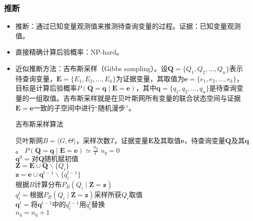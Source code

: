 \documentclass{ctexart}
\begin{document}
					\subsubsection{推断}
						\begin{itemize}
							\item 推断：通过已知变量观测值来推测待查询变量的过程。证据：已知变量观测值。
							\item 直接精确计算后验概率：NP-hard。
							\item 近似推断方法：吉布斯采样（Gibbs sampling）。设$\bm{Q}=\{Q_1,Q_2,\dots,Q_n\}$表示待查询变量，$\bm{E}=\{E_1,E_2,\dots,E_k\}$为证据变量，其取值为$\bm{e}=\{e_1,e_2,\dots,e_k\}$，目标是计算后验概率$P(\bm{Q}=\bm{q}\mid\bm{E}=\bm{e})$，其中$\bm{q}=\{q_1,q_2,\dots,q_n\}$是待查询变量的一组取值。吉布斯采样就是在贝叶斯网所有变量的联合状态空间与证据$\bm{E}=\bm{e}$一致的子空间中进行``随机漫步''。\begin{algorithm}
								\caption{吉布斯采样算法}
								\begin{algorithmic}[1]
									\REQUIRE 贝叶斯网$B=\langle G,\Theta\rangle$，采样次数$T$，证据变量$\bm{E}$及其取值$\bm{e}$，待查询变量$\bm{Q}$及其$\bm{q}$。
									\ENSURE $P(\bm{Q}=\bm{q}\mid\bm{E}=\bm{e})\simeq\frac{n_q}{T}$
									\STATE $n_q=0$ \\
									\STATE $\bm{q}^0=\textrm{对}\bm{Q}\textrm{随机赋初值}$ \\
											\STATE $\bm{Z}=\bm{E}\cup\bm{Q}\backslash\{Q_i\}$\\
											\STATE $\bm{z}=\bm{e}\cup\bm{q}^{t-1}\backslash\{q_i^{t-1}\}$\\
											\STATE 根据$B$计算分布$P_B(Q_i\mid\bm{Z}=\bm{z})$\\
											\STATE $q_i^t=\textrm{根据}P_B(Q_i\mid\bm{Z}=\bm{z})\textrm{采样所获}Q_i\textrm{取值}$\\
											\STATE $\bm{q}^t=\textrm{将}\bm{q}^{t-1}\textrm{中的}q_i^{t-1}\textrm{用}q_i^t\textrm{替换}$\\
										\ENDFOR
										\STATE $n_q=n_q+1$\\
									\ENDIF
								\ENDFOR
								\end{algorithmic} 
							\end{algorithm}
						\end{itemize}
\end{document}
